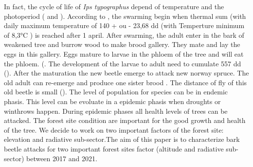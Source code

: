 \documentclass[3p,times]{elsarticle}
\begin{document}
In fact, the cycle of life of \textit{Ips typographus} depend of temperature and the photoperiod (\citep{baier_phenipscomprehensive_2007} and \citep{annila_influence_1969}).
According to \citep{baier_phenipscomprehensive_2007}, the swarming begin when thermal sum (with daily maximum temperature  of 140 + ou - 23,68 dd (with Temperture minimum of 8,3°C ) is reached after 1 april.
After swarming, the adult enter in the bark of weakened tree and burrow wood to make brood gallery. They mate and lay the eggs in this gallery. Eggs mature to larvae in the phloem of the tree and will eat the phloem. (\citep{hlasny_bark_2021}. The development of the larvae to adult need to cumulate 557 dd (\citep{baier_phenipscomprehensive_2007}). After the maturation the new beetle emerge to attack new norway spruce.
The old adult can re-emerge and produce one sister brood . The distance of fly of this old beetle is small (\citep{zolubas_1995}). The level of population for species can be in endemic phasis. This level can be evoluate in a epidemic phasis when droughts or winthrows happen. During epidemic phases all health levels of trees can be attacked. The forest site condition are important for the good growth and health of the tree. We decide to work on two important factors of the forest site: elevation and radiative sub-sector.The aim of this paper is to characterize bark beetle attacks for two important forest sites factor (altitude and radiative sub-sector) between 2017 and 2021.  









\end{document}

